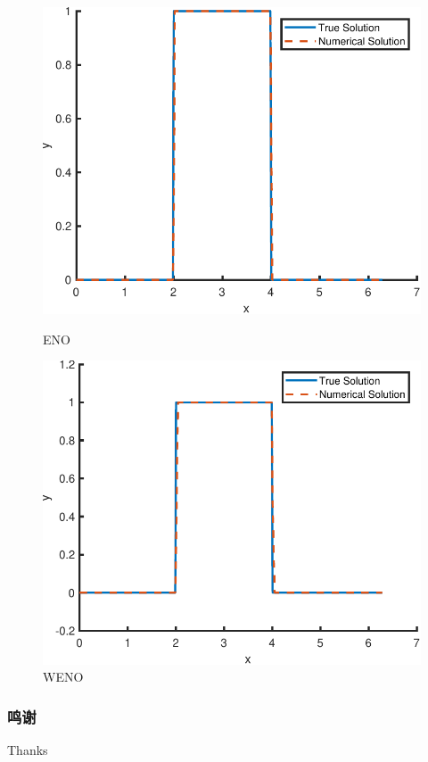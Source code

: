 \documentclass{beamer}
\begin{document}
\begin{frame}
\begin{figure}
        \centering
        \begin{minipage}{0.35\linewidth}
            \centering
            \includegraphics[width=\linewidth]{images/ENODiscontinue.pdf}
            \caption{ENO}
        \end{minipage}
        \hspace{1cm}
        \begin{minipage}{0.35\linewidth}
            \centering
            \includegraphics[width=\linewidth]{images/WENODiscontinue.pdf}
            \caption{WENO}
        \end{minipage}

    \end{figure}
\end{frame}
\begin{frame}
    \frametitle{鸣谢}
    \Huge
    \begin{center}
        Thanks
    \end{center}
\end{frame}
\end{document}
